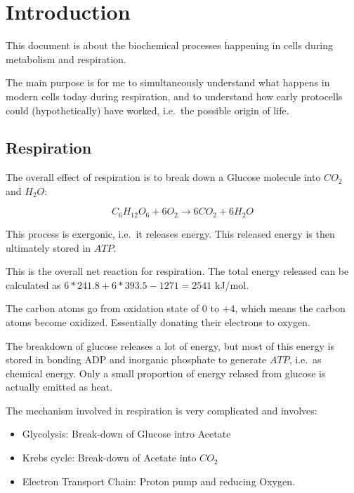 \documentclass{article}
\begin{document}

\section{Introduction}

This document is about the biochemical processes happening in cells during metabolism and
respiration.

The main purpose is for me to simultaneously understand what happens in modern cells today
during respiration, and to understand how early protocells could (hypothetically) have
worked, i.e.\ the possible origin of life.

\subsection{Respiration}
The overall effect of respiration is to break down a Glucose molecule into $CO_2$ and
$H_2O$:

\[
    C_6H_{12}O_6 + 6O_2 \rightarrow 6CO_2 + 6H_2O
\]

This process is exergonic, i.e.\ it releases energy. This released energy is then
ultimately stored in $\mathit{ATP}$.

This is the overall net reaction for respiration. The total energy released can be calculated as
$6*241.8 + 6*393.5 - 1271 = 2541$ kJ/mol.

The carbon atoms go from oxidation state of 0 to +4, which means the carbon atoms become
oxidized. Essentially donating their electrons to oxygen.

The breakdown of glucose releases a lot of energy, but most of this energy is stored in
bonding ADP and inorganic phosphate to generate $\mathit{ATP}$, i.e.\ as chemical energy. Only a
small proportion of energy relased from glucose is actually emitted as heat.

The mechanism involved in respiration is very complicated and involves:
\begin{itemize}
    \item Glycolysis: Break-down of Glucose intro Acetate
    \item Krebs cycle: Break-down of Acetate into $CO_2$
    \item Electron Transport Chain: Proton pump and reducing Oxygen.
\end{itemize}
\end{document}
